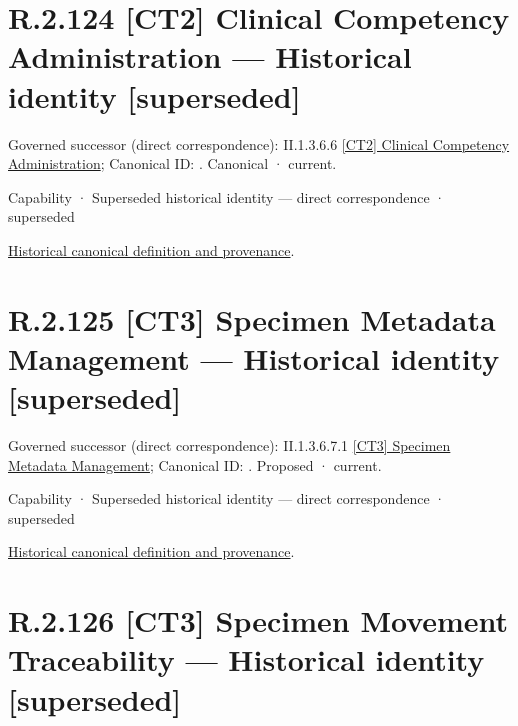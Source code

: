 \section*{R.2.124 [CT2] Clinical Competency Administration — Historical identity [superseded]}
\label{navigation:R.2.124}

{\small Governed successor (direct correspondence): II.1.3.6.6 \hyperref[element:8a99f4a6e5054d6c997bacec04805c01]{[CT2] Clinical Competency Administration}; Canonical ID: \texttt{}. Canonical · current.}\par
\label{element:8a4b918e1c9d47bb99daf2b42008ab39}
{\small Capability · Superseded historical identity — direct correspondence · superseded}\par
\href{../../../../../../../continuum/strategy/capability/8a4b918e1c9d47bb99daf2b42008ab39.md}{Historical canonical definition and provenance}.\par
\section*{R.2.125 [CT3] Specimen Metadata Management — Historical identity [superseded]}
\label{navigation:R.2.125}

{\small Governed successor (direct correspondence): II.1.3.6.7.1 \hyperref[element:738736425b7446fdae47b06c91c4f69c]{[CT3] Specimen Metadata Management}; Canonical ID: \texttt{}. Proposed · current.}\par
\label{element:3b000d3712534d16a48470f79df8e33a}
{\small Capability · Superseded historical identity — direct correspondence · superseded}\par
\href{../../../../../../../continuum/strategy/capability/3b000d3712534d16a48470f79df8e33a.md}{Historical canonical definition and provenance}.\par
\section*{R.2.126 [CT3] Specimen Movement Traceability — Historical identity [superseded]}
\label{navigation:R.2.126}

